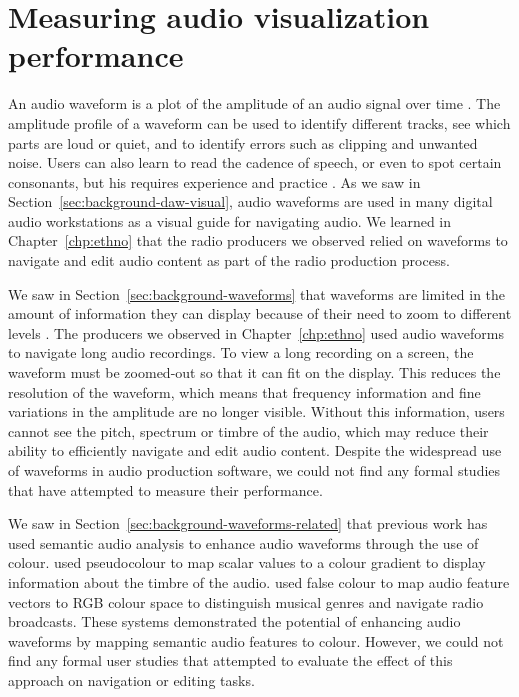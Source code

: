 \chapter{Measuring audio visualization performance}\label{chp:colourised}


An audio waveform is a plot of the amplitude of an audio signal over time \citep[p.~92]{Hausman2012}.  The amplitude
profile of a waveform can be used to identify different tracks, see which parts are loud or quiet, and to identify
errors such as clipping and unwanted noise.  Users can also learn to read the cadence of speech, or even to spot
certain consonants, but his requires experience and practice \citep[p.~115]{Hausman2012}.  As we saw in
Section~\ref{sec:background-daw-visual}, audio waveforms are used in many digital audio workstations as a visual guide
for navigating audio. We learned in Chapter~\ref{chp:ethno} that the radio producers we observed relied on
waveforms to navigate and edit audio content as part of the radio production process.

We saw in Section~\ref{sec:background-waveforms} that waveforms are limited in the amount of information they can
display because of their need to zoom to different levels \citep{Loviscach2011}.  The producers we observed in
Chapter~\ref{chp:ethno} used audio waveforms to navigate long audio recordings. To view a long recording on a screen,
the waveform must be zoomed-out so that it can fit on the display.  This reduces the resolution of the waveform, which
means that frequency information and fine variations in the amplitude are no longer visible.  Without this information,
users cannot see the pitch, spectrum or timbre of the audio, which may reduce their ability to efficiently navigate and
edit audio content.  Despite the widespread use of waveforms in audio production software, we could not find any formal
studies that have attempted to measure their performance.

We saw in Section~\ref{sec:background-waveforms-related} that previous work has used semantic audio analysis to enhance
audio waveforms through the use of colour.  \citet{Rice2005,Akkermans2011,Loviscach2011a} used pseudocolour to map
scalar values to a colour gradient to display information about the timbre of the audio.
\citet{Tzanetakis2000,Mason2007} used false colour to map audio feature vectors to RGB colour space to distinguish
musical genres and navigate radio broadcasts.  These systems demonstrated the potential of enhancing audio waveforms by
mapping semantic audio features to colour. However, we could not find any formal user studies that attempted to
evaluate the effect of this approach on navigation or editing tasks.

